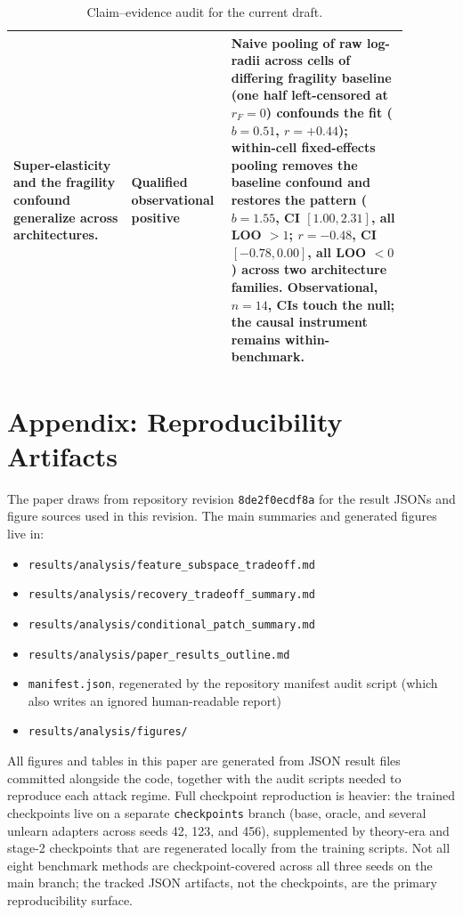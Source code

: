 \documentclass[11pt]{article}
\begin{document}
\begin{table}[t]
\begin{tabular}{p{0.28\linewidth} p{0.18\linewidth} p{0.42\linewidth}}
    Super-elasticity and the fragility confound generalize across architectures. & Qualified observational positive & Naive pooling of raw log-radii across cells of differing fragility baseline (one half left-censored at $r_F{=}0$) confounds the fit ($b{=}0.51$, $r{=}{+}0.44$); within-cell fixed-effects pooling removes the baseline confound and restores the pattern ($b{=}1.55$, CI $[1.00,2.31]$, all LOO $>1$; $r{=}{-}0.48$, CI $[-0.78,0.00]$, all LOO $<0$) across two architecture families. Observational, $n{=}14$, CIs touch the null; the causal instrument remains within-benchmark. \\
    \bottomrule
  \end{tabular}
  \caption{Claim--evidence audit for the current draft.}
  \label{tab:claim-evidence}
\end{table}

\section{Appendix: Reproducibility Artifacts}
The paper draws from repository revision \texttt{8de2f0ecdf8a} for the result JSONs and figure sources used in this revision. The main summaries and generated figures live in:
\begin{itemize}[leftmargin=1.5em]
  \item \texttt{results/analysis/feature\_subspace\_tradeoff.md}
  \item \texttt{results/analysis/recovery\_tradeoff\_summary.md}
  \item \texttt{results/analysis/conditional\_patch\_summary.md}
  \item \texttt{results/analysis/paper\_results\_outline.md}
  \item \texttt{manifest.json}, regenerated by the repository manifest audit script (which also writes an ignored human-readable report)
  \item \texttt{results/analysis/figures/}
\end{itemize}

All figures and tables in this paper are generated from JSON result files committed alongside the code, together with the audit scripts needed to reproduce each attack regime. Full checkpoint reproduction is heavier: the trained checkpoints live on a separate \texttt{checkpoints} branch (base, oracle, and several unlearn adapters across seeds 42, 123, and 456), supplemented by theory-era and stage-2 checkpoints that are regenerated locally from the training scripts. Not all eight benchmark methods are checkpoint-covered across all three seeds on the main branch; the tracked JSON artifacts, not the checkpoints, are the primary reproducibility surface.
\end{document}
